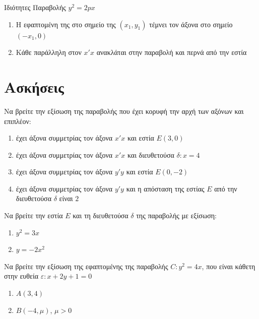 \documentclass{presentation}
\begin{document}
\begin{frame}[label=Ιδιότητες]{Ιδιότητες Παραβολής $y^2=2px$}
  \begin{enumerate}
    \item<1-> Η εφαπτομένη της στο σημείο της $(x_1,y_1)$ τέμνει τον άξονα στο σημείο $(-x_1,0)$
    \item<2-> Κάθε παράλληλη στον $x'x$ ανακλάται στην παραβολή και περνά από την εστία
  \end{enumerate}

\end{frame}

\section{Ασκήσεις}
\begin{askisi}
  Να βρείτε την εξίσωση της παραβολής που έχει κορυφή την αρχή των αξόνων και επιπλέον:
  \begin{enumerate}
    \item<1-> έχει άξονα συμμετρίας τον άξονα $x'x$ και εστία $Ε(3,0)$
    \item<2-> έχει άξονα συμμετρίας τον άξονα $x'x$ και διευθετούσα $δ:x=4$
    \item<3-> έχει άξονα συμμετρίας τον άξονα $y'y$ και εστία $Ε(0,-2)$
    \item<4-> έχει άξονα συμμετρίας τον άξονα $y'y$ και η απόσταση της εστίας $Ε$ από την διευθετούσα $δ$ είναι $2$
  \end{enumerate}


\end{askisi}

\begin{askisi}
  Να βρείτε την εστία $Ε$ και τη διευθετούσα $δ$ της παραβολής με εξίσωση:
  \begin{enumerate}
    \item<1-> $y^2=3x$
    \item<2-> $y=-2x^2$
  \end{enumerate}


\end{askisi}

\begin{askisi}
  Να βρείτε την εξίσωση της εφαπτομένης της παραβολής $C:y^2=4x$, που είναι κάθετη στην ευθεία $ε:x+2y+1=0$
  \begin{enumerate}
    \item<1-> $Α(3,4)$
    \item<2-> $Β(-4,μ)$, $μ>0$
  \end{enumerate}


\end{askisi}
\end{document}
